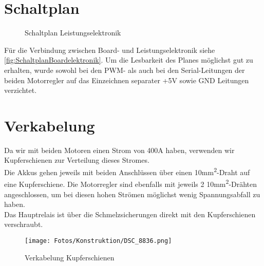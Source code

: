 \section{Schaltplan}
\begin{figure}[H]
    
    \caption{Schaltplan Leistungselektronik\label{fig:schaltLeistung}}
\end{figure}
Für die Verbindung zwischen Board- und Leistungselektronik siehe \autoref{fig:SchaltplanBoardelektronik}.
Um die Lesbarkeit des Planes möglichst gut zu erhalten, wurde sowohl bei den PWM- als auch bei den Serial-Leitungen der beiden Motorregler auf das Einzeichnen separater +5V sowie GND Leitungen verzichtet.

\clearpage
\section{Verkabelung}
Da wir mit beiden Motoren einen Strom von 400A haben, verwenden wir Kupferschienen zur Verteilung dieses Stromes.\\
Die Akkus gehen jeweils mit beiden Anschlüssen über einen 10mm\textsuperscript{2}-Draht auf eine Kupferschiene. Die Motorregler sind ebenfalls mit jeweils 2 10mm\textsuperscript{2}-Drähten angeschlossen, um bei diesen hohen Strömen möglichst wenig Spannungsabfall zu haben.\\
Das Hauptrelais ist über die Schmelzsicherungen direkt mit den Kupferschienen verschraubt.
\begin{figure}[H]
    \texttt{[image: Fotos/Konstruktion/DSC\_8836.png]}
    \caption{Verkabelung Kupferschienen}
\end{figure}


\clearpage